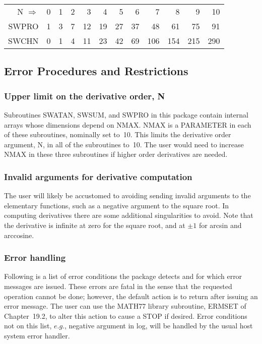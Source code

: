 \documentclass[twoside]{MATH77}
\begin{document}
\begin{tabular}{@{\ \ }r@{\ \ }r@{\ \ }r@{\ \ }r@{\ \ }r@{\ \ }r@{\ \ }r@{\ \ }r@{\ \ }r@{\ \ }r@{\ \ }r@{\ \ }r@{\ \ }}
N $\Rightarrow$ & 0 & 1 & 2 & 3 & 4 & 5 & 6 & 7 & 8 & 9 & 10\\
SWPRO & 1 & 3 & 7 & 12 & 19 & 27 & 37 & 48 & 61 & 75 & 91\\
SWCHN & 0 & 1 & 4 & 11 & 23 & 42 & 69 & 106 & 154 & 215 & 290
\end{tabular}
\nocite{Lawson:1971:CDU}




\subsection{Error Procedures and Restrictions}

\subsubsection{Upper limit on the derivative order, N}

Subroutines SWATAN, SWSUM, and SWPRO in this package contain internal arrays
whose dimensions depend on NMAX. NMAX is a PARAMETER in each of these
subroutines, nominally set to~10. This limits the derivative order argument,
N, in all of the subroutines to~10. The user would need to increase NMAX in
these three subroutines if higher order derivatives are needed.

\subsubsection{Invalid arguments for derivative computation}

The user will likely be accustomed to avoiding sending invalid arguments to
the elementary functions, such as a negative argument to the square root. In
computing derivatives there are some additional singularities to avoid. Note
that the derivative is infinite at zero for the square root, and at $\pm 1$
for arcsin and arccosine.

\subsubsection{Error handling}

Following is a list of error conditions the package detects and for which
error messages are issued. These errors are fatal in the sense that the
requested operation cannot be done; however, the default action is to return
after issuing an error message. The user can use the MATH77 library
subroutine, ERMSET of Chapter~19.2, to alter this action to cause a STOP
if desired. Error conditions not on this list, $e.g.$, negative argument
in log, will be handled by the usual host system error handler.
\end{document}
